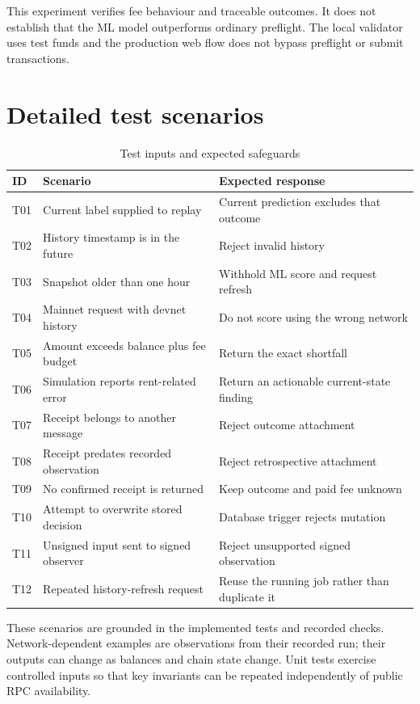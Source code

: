 \documentclass[12pt,a4paper,oneside]{report}
\begin{document}
This experiment verifies fee behaviour and traceable outcomes. It does not establish that the ML model outperforms ordinary preflight. The local validator uses test funds and the production web flow does not bypass preflight or submit transactions.

\section{Detailed test scenarios}
\begin{table}[htbp]\centering\caption{Test inputs and expected safeguards}
\small\begin{tabularx}{\textwidth}{p{12mm}YY}\toprule ID&Scenario&Expected response\\\midrule
T01&Current label supplied to replay&Current prediction excludes that outcome\\
T02&History timestamp is in the future&Reject invalid history\\
T03&Snapshot older than one hour&Withhold ML score and request refresh\\
T04&Mainnet request with devnet history&Do not score using the wrong network\\
T05&Amount exceeds balance plus fee budget&Return the exact shortfall\\
T06&Simulation reports rent-related error&Return an actionable current-state finding\\
T07&Receipt belongs to another message&Reject outcome attachment\\
T08&Receipt predates recorded observation&Reject retrospective attachment\\
T09&No confirmed receipt is returned&Keep outcome and paid fee unknown\\
T10&Attempt to overwrite stored decision&Database trigger rejects mutation\\
T11&Unsigned input sent to signed observer&Reject unsupported signed observation\\
T12&Repeated history-refresh request&Reuse the running job rather than duplicate it\\\bottomrule\end{tabularx}\end{table}
These scenarios are grounded in the implemented tests and recorded checks. Network-dependent examples are observations from their recorded run; their outputs can change as balances and chain state change. Unit tests exercise controlled inputs so that key invariants can be repeated independently of public RPC availability.
\end{document}
